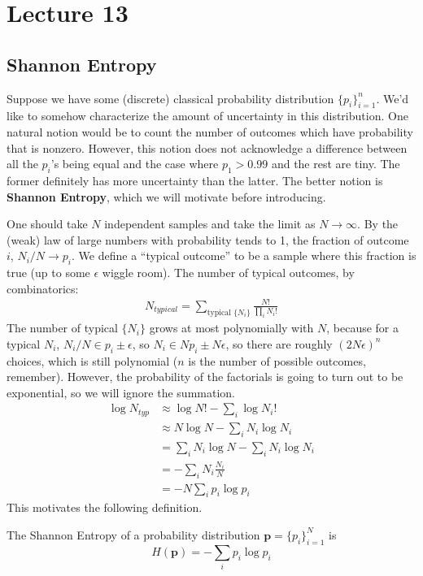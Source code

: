 \section{Lecture 13}

\subsection{Shannon Entropy}
Suppose we have some (discrete) classical probability distribution $\{p_i\}_{i = 1}^n$. We'd like to somehow
characterize the amount of uncertainty in this distribution. One natural notion would be to count the number of outcomes which
have probability that is nonzero. However, this notion does not acknowledge a difference between all the $p_i$'s being equal
and the case where $p_1 > 0.99$ and the rest are tiny. The former definitely has more uncertainty than the latter.
The better notion is \textbf{Shannon Entropy}, which we will motivate before introducing.

One should take $N$ independent samples and take the limit as $N \to \infty$. By the (weak) law of large numbers
with probability tends to 1, the fraction of outcome $i$, $N_i/N \to p_i$. We define a ``typical outcome'' to be a sample where
this fraction is true (up to some $\epsilon$ wiggle room). The number of typical outcomes, by combinatorics:
\begin{align*}
    N_{typical} = \sum_{\text{typical } \{N_i\}}\frac{N!}{\prod_{i} N_i!}
\end{align*}
The number of typical $\{N_i\}$ grows at most polynomially with $N$, because for a typical $N_i$,
$N_i/N \in p_i \pm \epsilon$, so $N_i \in Np_i \pm N \epsilon$, so there are roughly $(2N \epsilon)^n$ choices,
which is still polynomial ($n$ is the number of possible outcomes, remember). However, the probability of the factorials is
going to turn out to be exponential, so we will ignore the summation.
\begin{align*}
    \log N_{typ} &\approx \log N! - \sum_i \log N_i! \\
    &\approx N \log N - \sum_i N_i \log N_i \\
    &= \sum_i N_i \log N - \sum_i N_i \log N_i \\
    &= - \sum_i N_i \frac{N_i}{N} \\
    &= - N \sum_i p_i \log p_i
\end{align*}
This motivates the following definition.

\begin{definition}
    The Shannon Entropy of a probability distribution $\mathbf{p} = \{p_i\}_{i = 1}^N$ is
    \[ H(\mathbf{p}) = -\sum_i p_i \log p_i \] 
\end{definition}

